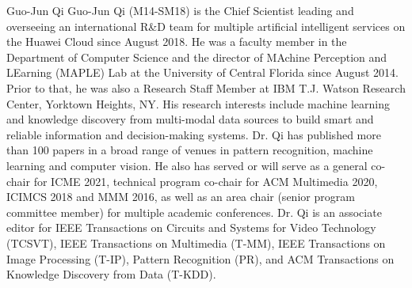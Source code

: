 \documentclass[journal]{IEEEtran}
\begin{document}
\begin{IEEEbiography}{Guo-Jun Qi}
Guo-Jun Qi (M14-SM18) is the
Chief Scientist leading and overseeing an international R\&D team for multiple artificial intelligent
services on the Huawei Cloud since August
2018. He was a faculty member in the Department
of Computer Science and the director of
MAchine Perception and LEarning (MAPLE) Lab
at the University of Central Florida since August
2014. Prior to that, he was also a Research Staff
Member at IBM T.J. Watson Research Center,
Yorktown Heights, NY. His research interests include
machine learning and knowledge discovery from multi-modal data
sources to build smart and reliable information and decision-making
systems. Dr. Qi has published more than 100 papers in a broad range
of venues in pattern recognition, machine learning and computer vision.
He also has served or will serve as a general co-chair for ICME 2021,
technical program co-chair for ACM Multimedia 2020, ICIMCS 2018
and MMM 2016, as well as an area chair (senior program committee
member) for multiple academic conferences. Dr. Qi is an associate editor
for IEEE Transactions on Circuits and Systems for Video Technology (TCSVT),
IEEE Transactions on Multimedia (T-MM), IEEE Transactions on
Image Processing (T-IP), Pattern Recognition (PR), and ACM Transactions
on Knowledge Discovery from Data (T-KDD).
\end{IEEEbiography}
\end{document}

